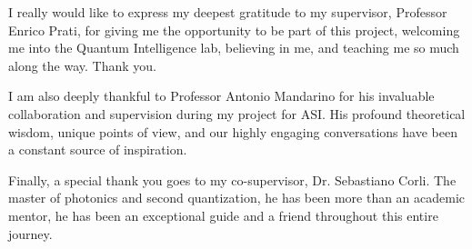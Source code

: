\cleardoublepage
{}


I really would like to express my deepest gratitude to my supervisor, Professor Enrico Prati, for giving me the opportunity to be part of this project, welcoming me into the Quantum Intelligence lab, believing in me, and teaching me so much along the way. Thank you.

I am also deeply thankful to Professor Antonio Mandarino for his invaluable collaboration and supervision during my project for ASI. His profound theoretical wisdom, unique points of view, and our highly engaging conversations have been a constant source of inspiration.

Finally, a special thank you goes to my co-supervisor, Dr. Sebastiano Corli. The master of photonics and second quantization, he has been more than an academic mentor, he has been an exceptional guide and a friend throughout this entire journey.

\vspace*{-2ex}
{ \slshape

    \begin{flushright}

        \sffamily\large
        \ThesisAuthor
    \end{flushright}
}

\vfill
